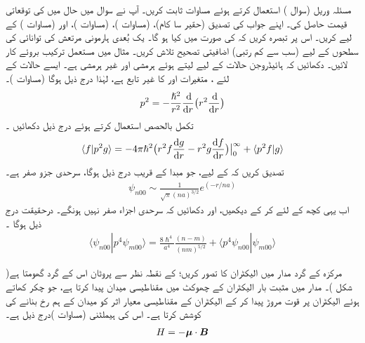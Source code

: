   
مسئلہ وریل (سوال )  استعمال کرتے ہوئے مساوات    ثابت کریں۔ 
آپ نے سوال    میں حال  میں   کی توقعاتی قیمت حاصل کی۔ اپنے جواب کی تصدیق  (حقیر  سا کام)،   (مساوات )،   (مساوات )،   اور  (مساوات ) کے لیے کریں۔ اس پر تبصرہ کریں کہ   کی صورت میں کیا ہو گا۔
 یک بُعدی ہارمونی مرتعش کی توانائی کی سطحوں کے لیے (سب سے کم رتبی)  اضافیتی تصحیح تلاش کریں۔  مثال    میں مستعمل ترکیب بروئے کار لائیں۔ 
دکھائیں کہ ہائیڈروجن حالات کے لیے  لیتے ہوئے  ہرمشی  اور   غیر ہرمشی  ہے۔  ایسے  حالات کے لئے ،  متغیرات  اور  کا غیر تابع ہے،   لہٰذا   درج ذیل ہوگا  (مساوات )۔
\begin{align*}
p^2 = - \frac{\hslash^2}{r^2} \frac{\dif }{\dif r} \big ( r^2 \frac{\dif}{\dif r} \big )
\end{align*}
تکمل بالحصص استعمال کرتے ہوئے درج ذیل دکھائیں ۔
\begin{align*}
\langle f | p^2 g \rangle = - 4 \pi \hslash^2 
\big ( r^2 f \frac{\dif g}{\dif r} - r^2 g \frac{\dif f}{\dif r} \big ) \big \rvert_0^{\infty} + \langle p^2 f | g \rangle 
\end{align*}
تصدیق کریں  کہ  کے لیے، جو مبدا کے قریب درج ذیل ہوگا، سرحدی جزو صفر ہے۔
\begin{align*}
\psi_{n00} \sim \frac{1}{\sqrt{\pi} (na)^{3/2}} e^{(-r/na)}
\end{align*}
اب یہی کچھ  کے لئے کر کے دیکھیں،  اور دکھائیں  کہ سرحدی اجزاء صفر نہیں ہونگے۔  درحقیقت درج ذیل ہوگا ۔
\begin{align*}
\langle \psi_{n00} | p^4 \psi_{m00} \rangle = \frac{8\hslash^4}{a^4} \frac{(n - m)}{(nm)^{5/2}} + \langle p^4 \psi_{n00} | \psi_{m00} \rangle
\end{align*}


مرکزہ کے گرد مدار میں الیکٹران کا تصور کریں؛    کے نقطہ نظر سے پروٹان اس کے گرد گھومتا ہے( شکل )۔   مدار میں مثبت بار الیکٹران کے چھوکٹ میں مقناطیسی میدان    پیدا کرتا ہے،  جو چکر کھاتے ہوئے الیکٹران پر  قوت مروڑ   پیدا کر کے الیکٹران کے مقناطیسی معیار اثر  کو میدان کے ہم رخ بنانے کی کوشش کرتا ہے۔  اس کی ہیملٹنی (مساوات )درج ذیل ہے۔
\begin{align}\label{مساوات_غیر_مضطرب_مقناطیسی_میدان_میں_ہیملٹنی}
H = - {{\boldsymbol{\mu}}} \cdot {\ensuremath{{\boldsymbol{B}}}}
\end{align}

